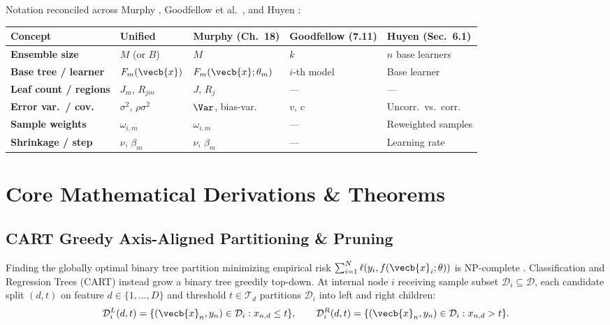 \documentclass[../../../../master.tex]{subfiles}
\begin{document}
\begin{crossbook}
\label{tab:trees:notation}
Notation reconciled across Murphy , Goodfellow et al.\ , and Huyen :

\smallskip
\centering
\footnotesize
\begin{tabularx}{\linewidth}{@{} >{\bfseries}l l l l X @{}}
\toprule
Concept & Unified & Murphy (Ch.~18) & Goodfellow (7.11) & Huyen (Sec.~6.1) \\
\midrule
Ensemble size & $M$ (or $B$) & $M$ & $k$ & $n$ base learners \\
Base tree / learner & $F_m(\vecb{x})$ & $F_m(\vecb{x}; \theta_m)$ & $i$-th model & Base learner \\
Leaf count / regions & $J_m$, $R_{jm}$ & $J$, $R_j$ & --- & --- \\
Error var.\ / cov. & $\sigma^2$, $\rho\sigma^2$ & $\Var$, bias-var. & $v$, $c$ & Uncorr.\ vs.\ corr. \\
Sample weights & $\omega_{i,m}$ & $\omega_{i,m}$ & --- & Reweighted samples \\
Shrinkage / step & $\nu$, $\beta_m$ & $\nu$, $\beta_m$ & --- & Learning rate \\
\bottomrule
\end{tabularx}
\end{crossbook}

\section{Core Mathematical Derivations \& Theorems}

\subsection{CART Greedy Axis-Aligned Partitioning \& Pruning}

Finding the globally optimal binary tree partition minimizing empirical risk $\sum_{i=1}^{N} \ell(y_i, f(\vecb{x}_i; \theta))$ is NP-complete . Classification and Regression Trees (CART) instead grow a binary tree greedily top-down. At internal node $i$ receiving sample subset $\mathcal{D}_i \subseteq \mathcal{D}$, each candidate split $(d, t)$ on feature $d \in \{1,\dots,D\}$ and threshold $t \in \mathcal{T}_d$ partitions $\mathcal{D}_i$ into left and right children:
\begin{equation}
  \mathcal{D}_{i}^{L}(d, t) = \{(\vecb{x}_n, y_n) \in \mathcal{D}_i : x_{n,d} \le t\}, \qquad
  \mathcal{D}_{i}^{R}(d, t) = \{(\vecb{x}_n, y_n) \in \mathcal{D}_i : x_{n,d} > t\}.
  \label{eq:trees:split_sets}
\end{equation}
\end{document}

